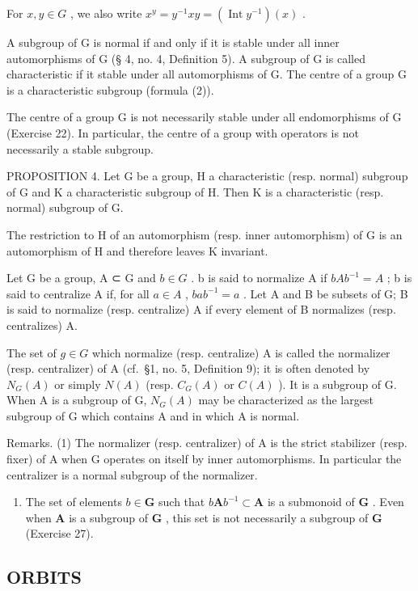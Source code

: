 For \(x, y \in G\) , we also write \(x^y = y^{-1}xy = (\operatorname{Int} y^{-1})(x)\) .

A subgroup of G is normal if and only if it is stable under all inner automorphisms of G (§ 4, no. 4, Definition 5). A subgroup of G is called characteristic if it stable under all automorphisms of G. The centre of a group G is a characteristic subgroup (formula (2)).

The centre of a group G is not necessarily stable under all endomorphisms of G (Exercise 22). In particular, the centre of a group with operators is not necessarily a stable subgroup.

PROPOSITION 4. Let G be a group, H a characteristic (resp. normal) subgroup of G and K a characteristic subgroup of H. Then K is a characteristic (resp. normal) subgroup of G.

The restriction to H of an automorphism (resp. inner automorphism) of G is an automorphism of H and therefore leaves K invariant.

Let G be a group, A ⊂ G and \(b \in G\) . b is said to normalize A if \(bAb^{-1} = A\) ; b is said to centralize A if, for all \(a \in A\) , \(bab^{-1} = a\) . Let A and B be subsets of G; B is said to normalize (resp. centralize) A if every element of B normalizes (resp. centralizes) A.

The set of \(g \in G\) which normalize (resp. centralize) A is called the normalizer (resp. centralizer) of A (cf.~§1, no. 5, Definition 9); it is often denoted by \(N_{G}(A)\) or simply \(N(A)\) (resp. \(C_{G}(A)\) or \(C(A)\) ). It is a subgroup of G. When A is a subgroup of G, \(N_{G}(A)\) may be characterized as the largest subgroup of G which contains A and in which A is normal.

Remarks. (1) The normalizer (resp. centralizer) of A is the strict stabilizer (resp. fixer) of A when G operates on itself by inner automorphisms. In particular the centralizer is a normal subgroup of the normalizer.

\begin{enumerate}
\def\labelenumi{(\arabic{enumi})}
\setcounter{enumi}{1}
\tightlist
\item
  The set of elements \(b \in \mathbf{G}\) such that \(b\mathbf{A}b^{-1} \subset \mathbf{A}\) is a submonoid of \(\mathbf{G}\) . Even when \(\mathbf{A}\) is a subgroup of \(\mathbf{G}\) , this set is not necessarily a subgroup of \(\mathbf{G}\) (Exercise 27).
\end{enumerate}

\subsection{ORBITS}

